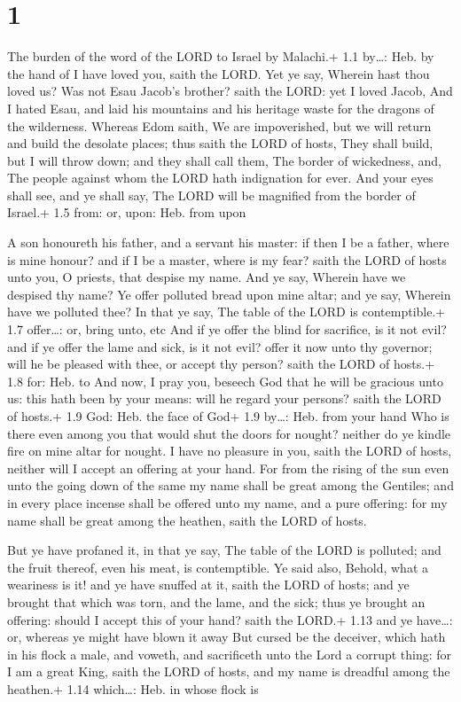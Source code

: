 \hypertarget{section}{%
\section{1}\label{section}}

 The burden of the word of the LORD to Israel by Malachi.+
1.1 by\ldots: Heb. by the hand of  I have loved you, saith
the LORD. Yet ye say, Wherein hast thou loved us? Was not Esau Jacob's
brother? saith the LORD: yet I loved Jacob,  And I hated
Esau, and laid his mountains and his heritage waste for the dragons of
the wilderness.  Whereas Edom saith, We are impoverished,
but we will return and build the desolate places; thus saith the LORD of
hosts, They shall build, but I will throw down; and they shall call
them, The border of wickedness, and, The people against whom the LORD
hath indignation for ever.  And your eyes shall see, and ye
shall say, The LORD will be magnified from the border of Israel.+ 1.5
from: or, upon: Heb. from upon

 A son honoureth his father, and a servant his master: if
then I be a father, where is mine honour? and if I be a master, where is
my fear? saith the LORD of hosts unto you, O priests, that despise my
name. And ye say, Wherein have we despised thy name?  Ye
offer polluted bread upon mine altar; and ye say, Wherein have we
polluted thee? In that ye say, The table of the LORD is contemptible.+
1.7 offer\ldots: or, bring unto, etc  And if ye offer the
blind for sacrifice, is it not evil? and if ye offer the lame and sick,
is it not evil? offer it now unto thy governor; will he be pleased with
thee, or accept thy person? saith the LORD of hosts.+ 1.8 for: Heb. to
 And now, I pray you, beseech God that he will be gracious
unto us: this hath been by your means: will he regard your persons?
saith the LORD of hosts.+ 1.9 God: Heb. the face of God+ 1.9 by\ldots:
Heb. from your hand  Who is there even among you that would
shut the doors for nought? neither do ye kindle fire on mine altar for
nought. I have no pleasure in you, saith the LORD of hosts, neither will
I accept an offering at your hand.  For from the rising of
the sun even unto the going down of the same my name shall be great
among the Gentiles; and in every place incense shall be offered unto my
name, and a pure offering: for my name shall be great among the heathen,
saith the LORD of hosts.

 But ye have profaned it, in that ye say, The table of
the LORD is polluted; and the fruit thereof, even his meat, is
contemptible.  Ye said also, Behold, what a weariness is
it! and ye have snuffed at it, saith the LORD of hosts; and ye brought
that which was torn, and the lame, and the sick; thus ye brought an
offering: should I accept this of your hand? saith the LORD.+ 1.13 and
ye have\ldots: or, whereas ye might have blown it away  But
cursed be the deceiver, which hath in his flock a male, and voweth, and
sacrificeth unto the Lord a corrupt thing: for I am a great King, saith
the LORD of hosts, and my name is dreadful among the heathen.+ 1.14
which\ldots: Heb. in whose flock is

